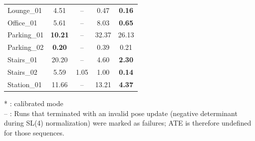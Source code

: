 \begin{table}[t!]
\begin{threeparttable}
{\begin{tabular}{l|cccc}
{\footnotesize Lounge\_01} & 4.51 & -- & 0.47 & \textbf{0.16} \\
{\footnotesize Office\_01} & 5.61 & -- & 8.03 & \textbf{0.65} \\
{\footnotesize Parking\_01} & \textbf{10.21} & -- & 32.37 & 26.13 \\
{\footnotesize Parking\_02} & \textbf{0.20} & -- & 0.39 & 0.21 \\
{\footnotesize Stairs\_01} & 20.20 & -- & 4.60 & \textbf{2.30} \\
{\footnotesize Stairs\_02} & 5.59 & 1.05 & 1.00 & \textbf{0.14} \\
{\footnotesize Station\_01} & 11.66 & -- & 13.21 & \textbf{4.37} \\
\midrule
\end{tabular}%
} 
\vspace{2mm}
\begin{tablenotes}[flushleft]
\item \footnotesize
\parbox{0.98\columnwidth}{%
* : calibrated mode \\
-- : Runs that terminated with an invalid pose update (negative determinant during SL(4) normalization) were marked as failures; ATE is therefore undefined for those sequences.
}
\end{tablenotes}
\end{threeparttable}
\label{tab:benchmark_our}
\end{table}
